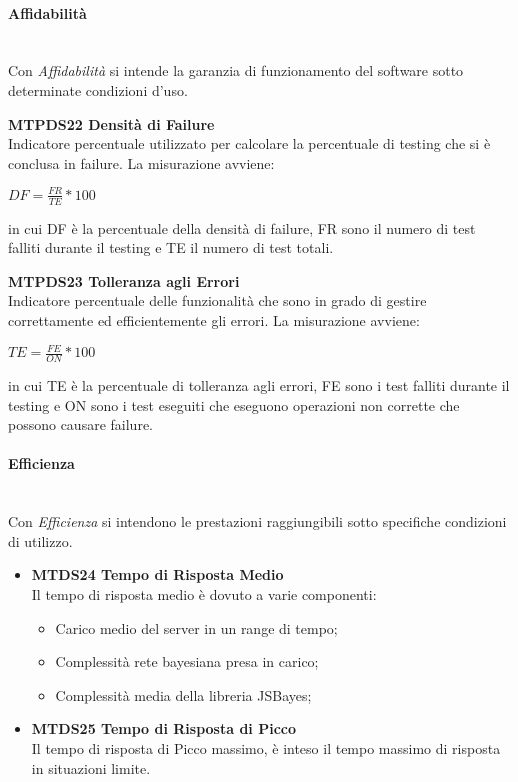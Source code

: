 \paragraph{Affidabilità}\-\\
Con \textit{Affidabilità} si intende la garanzia di funzionamento del software sotto determinate condizioni d'uso.
\begin{itemize}
	\item \textbf{MTPDS22 Densità di Failure} \-\\
	Indicatore percentuale utilizzato per calcolare la percentuale di testing che si è conclusa in failure. La misurazione avviene: 
	\begin{center}
		\item $ DF = \frac{FR}{TE}*100 $
	\end{center}
	in cui DF è la percentuale della densità di failure, FR sono il numero di test falliti durante il testing e TE il numero di test totali. 
	\item \textbf{MTPDS23 Tolleranza agli Errori} \-\\
	Indicatore percentuale delle funzionalità che sono in grado di gestire correttamente ed efficientemente gli errori. La misurazione avviene: 
	\begin{center}
		\item $ TE = \frac{FE}{ON}*100 $
	\end{center}
	in cui TE è la percentuale di tolleranza agli errori, FE sono i test falliti durante il testing e ON sono i test eseguiti che eseguono operazioni non corrette che possono causare failure. 
\end{itemize}

\paragraph{Efficienza}\-\\
Con \textit{Efficienza} si intendono le prestazioni raggiungibili sotto specifiche condizioni di utilizzo.
\begin{itemize}
	\item \textbf{MTDS24 Tempo di Risposta Medio}\\
		Il tempo di risposta medio è dovuto a varie componenti: 
		\begin{itemize}
			\item Carico medio del server in un range di tempo;
			\item Complessità rete bayesiana presa in carico; 
			\item Complessità media della libreria JSBayes; 
		\end{itemize} 
	\item \textbf{MTDS25 Tempo di Risposta di Picco}\\
		Il tempo di risposta di Picco massimo, è inteso il tempo massimo di risposta in situazioni limite.
\end{itemize}


